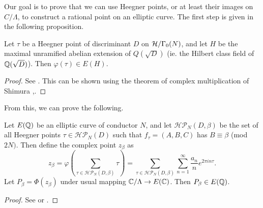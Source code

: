 Our goal is to prove that we can use Heegner points, or at least their images on $C/\Lambda$, to construct a rational point on an elliptic curve. The first step is given in the following proposition.
\begin{prop}
Let $\tau$ be a Heegner point of discriminant $D$ on $\mathcal{H}/\Gamma_0(N)$, and let $H$ be the maximal unramified abelian extension of $Q(\sqrt{D})$ (ie. the Hilbert class field of $\mathbb{Q}(\sqrt{D})$). Then $\varphi(\tau) \in E(H).$
\end{prop}
\begin{proof}
See \cite[Page 33]{Darmon2}. This can be shown using the theorem of complex multiplication of Shimura \cite{Shimura},\cite{Shimura&Taniyama}.
\end{proof}
From this, we can prove the following.
\begin{thm} Let $E(\mathbb{Q})$ be an elliptic curve of conductor $N$, and let $\mathcal{HP}_N(D,\beta)$ be the set of all Heegner points $\tau \in \mathcal{HP}_N(D)$ such that $f_\tau = (A,B,C)$ has $B \equiv \beta$ (mod $2N)$. Then define the complex point $z_\beta$ as
$$z_\beta = \varphi\left(\sum_{\tau \in \mathcal{HP}_N(D,\beta)} \tau\right) = \sum_{\tau \in \mathcal{HP}_N(D,\beta)} \sum_{n=1}^{\infty} \frac{a_n}{n}e^{2\pi i n \tau}.$$
Let $P_\beta = \Phi(z_\beta)$ under usual mapping $\mathbb{C}/\Lambda \to E(\mathbb{C})$. Then $P_\beta \in E(\mathbb{Q})$.
\end{thm}
\begin{proof}
See \cite{MR0384805} or \cite[Theorem 2.8]{Watkins}.
\end{proof}
